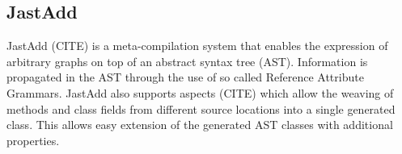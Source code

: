 \subsection{JastAdd}
JastAdd (CITE) is a meta-compilation system that enables the expression of arbitrary graphs on top of an abstract syntax tree (AST). Information is propagated in the AST through the use of so called Reference Attribute Grammars. JastAdd also supports aspects (CITE) which allow the weaving of methods and class fields from different source locations into a single generated class. This allows easy extension of the generated AST classes with additional properties.

